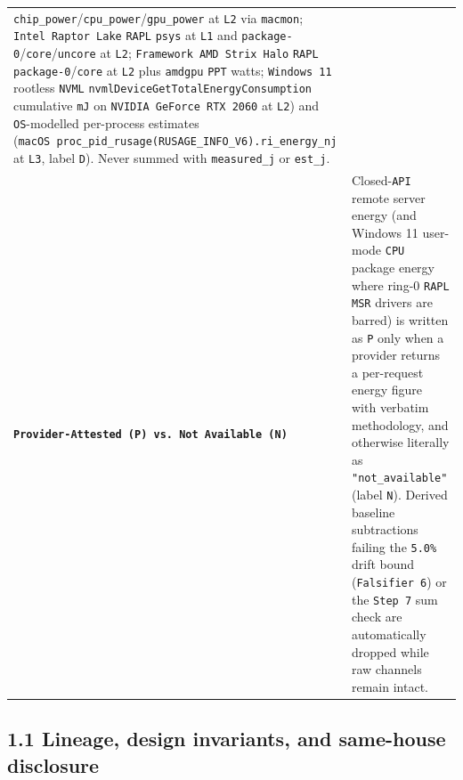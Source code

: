 \documentclass[10pt,letterpaper]{article}
\begin{document}
{\begin{longtable}[]{@{}
  >{\raggedright\arraybackslash}p{}
  >{\raggedright\arraybackslash}p{}@{}}
\texttt{chip\_\allowbreak{}power}/\texttt{cpu\_\allowbreak{}power}/\texttt{gpu\_\allowbreak{}power} at
\texttt{L2} via \texttt{macmon}; \texttt{Intel\ Raptor\ Lake}
\texttt{RAPL} \texttt{psys} at \texttt{L1} and
\texttt{package-0}/\allowbreak{}\texttt{core}/\allowbreak{}\texttt{uncore} at \texttt{L2};
\texttt{Framework\ AMD\ Strix\ Halo} \texttt{RAPL}
\texttt{package-0}/\allowbreak{}\texttt{core} at \texttt{L2} plus \texttt{amdgpu}
\texttt{PPT} watts; \texttt{Windows\ 11} rootless \texttt{NVML}
\texttt{nvmlDeviceGetTotalEnergyConsumption} cumulative \texttt{mJ} on
\texttt{NVIDIA\ GeForce\ RTX\ 2060} at \texttt{L2}) and
\texttt{OS}-modelled per-process estimates
(\texttt{macOS\ proc\_\allowbreak{}pid\_\allowbreak{}rusage(\allowbreak{}RUSAGE\_\allowbreak{}INFO\_\allowbreak{}V6).\allowbreak{}ri\_\allowbreak{}energy\_\allowbreak{}nj} at
\texttt{L3}, label \texttt{D}). Never summed with \texttt{measured\_\allowbreak{}j}
or \texttt{est\_j}. \\
\textbf{\texttt{Provider-\allowbreak{}Attested\ (\allowbreak{}P)\ vs.\allowbreak{}\ Not\ Available\ (\allowbreak{}N)}} &
Closed-\texttt{API} remote server energy (and Windows 11 user-mode
\texttt{CPU} package energy where ring-0 \texttt{RAPL} \texttt{MSR}
drivers are barred) is written as \texttt{P} only when a provider
returns a per-request energy figure with verbatim methodology, and
otherwise literally as \texttt{"not\_\allowbreak{}available"} (label \texttt{N}).
Derived baseline subtractions failing the \texttt{5.0\%} drift bound
(\texttt{Falsifier\ 6}) or the \texttt{Step\ 7} sum check are
automatically dropped while raw channels remain intact. \\
\end{longtable}
}

\subsection{1.1 Lineage, design invariants, and same-house
disclosure}\label{lineage-design-invariants-and-same-house-disclosure}
\end{document}
